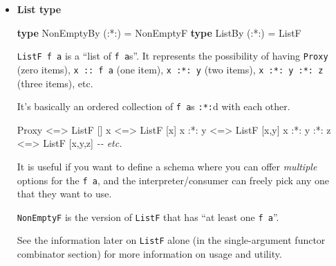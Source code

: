 \documentclass[]{article}
\newenvironment{Shaded}{}{}
\newcommand{\CommentTok}[1]{\textcolor[rgb]{0.38,0.63,0.69}{\textit{#1}}}
\newcommand{\DataTypeTok}[1]{\textcolor[rgb]{0.56,0.13,0.00}{#1}}
\newcommand{\KeywordTok}[1]{\textcolor[rgb]{0.00,0.44,0.13}{\textbf{#1}}}
\newcommand{\NormalTok}[1]{#1}
\newcommand{\OperatorTok}[1]{\textcolor[rgb]{0.40,0.40,0.40}{#1}}
\newcommand{\OtherTok}[1]{\textcolor[rgb]{0.00,0.44,0.13}{#1}}
\renewcommand{\href}[2]{#2\footnote{\url{#1}}}
\begin{document}
\begin{itemize}
  It is used to combine the results in both branches of the \texttt{:*:}.

  To introduce an ``empty'' branch, we need \texttt{Plus} (in
  \emph{\href{https://hackage.haskell.org/package/semigroupoids/docs/Data-Functor-Plus.html}{Data.Functor.Plus}}),
  which is like a higher-kinded \texttt{Monoid}, or \texttt{Alternative} with no
  \texttt{Applicative}:

\begin{Shaded}
\begin{Highlighting}[]
\KeywordTok{class} \DataTypeTok{Alt}\NormalTok{ f }\OtherTok{=\textgreater{}} \DataTypeTok{Plus}\NormalTok{ f }\KeywordTok{where}
\OtherTok{    zero ::}\NormalTok{ f a}
\end{Highlighting}
\end{Shaded}
\item
  \textbf{List type}

\begin{Shaded}
\begin{Highlighting}[]
\KeywordTok{type} \DataTypeTok{NonEmptyBy}\NormalTok{ (}\OperatorTok{:*:}\NormalTok{) }\OtherTok{=} \DataTypeTok{NonEmptyF}
\KeywordTok{type} \DataTypeTok{ListBy}\NormalTok{     (}\OperatorTok{:*:}\NormalTok{) }\OtherTok{=} \DataTypeTok{ListF}
\end{Highlighting}
\end{Shaded}

  \texttt{ListF\ f\ a} is a ``list of \texttt{f\ a}s''. It represents the
  possibility of having \texttt{Proxy} (zero items), \texttt{x\ ::\ f\ a} (one
  item), \texttt{x\ :*:\ y} (two items), \texttt{x\ :*:\ y\ :*:\ z} (three
  items), etc.

  It's basically an ordered collection of \texttt{f\ a}s \texttt{:*:}d with each
  other.

\begin{Shaded}
\begin{Highlighting}[]
\DataTypeTok{Proxy}         \OperatorTok{\textless{}=\textgreater{}} \DataTypeTok{ListF}\NormalTok{ []}
\NormalTok{x             }\OperatorTok{\textless{}=\textgreater{}} \DataTypeTok{ListF}\NormalTok{ [x]}
\NormalTok{x }\OperatorTok{:*:}\NormalTok{ y       }\OperatorTok{\textless{}=\textgreater{}} \DataTypeTok{ListF}\NormalTok{ [x,y]}
\NormalTok{x }\OperatorTok{:*:}\NormalTok{ y }\OperatorTok{:*:}\NormalTok{ z }\OperatorTok{\textless{}=\textgreater{}} \DataTypeTok{ListF}\NormalTok{ [x,y,z]}
\CommentTok{{-}{-} etc.}
\end{Highlighting}
\end{Shaded}

  It is useful if you want to define a schema where you can offer
  \emph{multiple} options for the \texttt{f\ a}, and the interpreter/consumer
  can freely pick any one that they want to use.

  \texttt{NonEmptyF} is the version of \texttt{ListF} that has ``at least one
  \texttt{f\ a}''.

  See the information later on \texttt{ListF} alone (in the single-argument
  functor combinator section) for more information on usage and utility.
\end{itemize}
\end{document}
